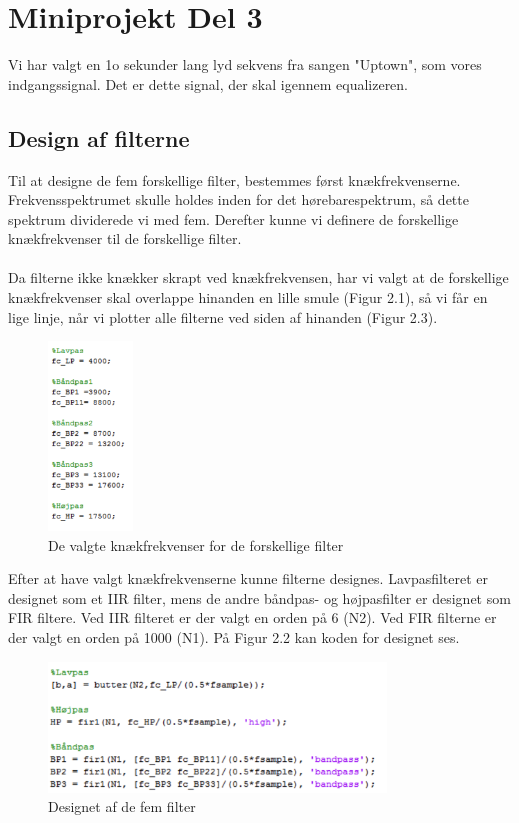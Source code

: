 \chapter{Miniprojekt Del 3}

Vi har valgt en 1o sekunder lang lyd sekvens fra sangen "Uptown", som vores indgangssignal. 
Det er dette signal, der skal igennem equalizeren. 

\section{Design af filterne}
Til at designe de fem forskellige filter, bestemmes først knækfrekvenserne. Frekvensspektrumet skulle holdes inden for det hørebarespektrum, så dette spektrum dividerede vi med fem. Derefter kunne vi definere de forskellige knækfrekvenser til de forskellige filter. 
\\ \\
Da filterne ikke knækker skrapt ved knækfrekvensen, har vi valgt at de forskellige knækfrekvenser skal overlappe hinanden en lille smule (Figur 2.1), så vi får en lige linje, når vi plotter alle filterne ved siden af hinanden (Figur 2.3). 

\begin{figure}[H]
	\centering
	\includegraphics[width=0.2\textwidth]{Figur/Snip20151111_61}
	\caption{De valgte knækfrekvenser for de forskellige filter}
\end{figure}

Efter at have valgt knækfrekvenserne kunne filterne designes. Lavpasfilteret er designet som et IIR filter, mens de andre båndpas- og højpasfilter er designet som FIR filtere. Ved IIR filteret er der valgt en orden på 6 (N2). Ved FIR filterne er der valgt en orden på 1000 (N1). På Figur 2.2 kan koden for designet ses.  

\begin{figure}[H]
	\centering
	\includegraphics[width=0.8\textwidth]{Figur/Snip20151111_64}
	\caption{Designet af de fem filter}
\end{figure}

